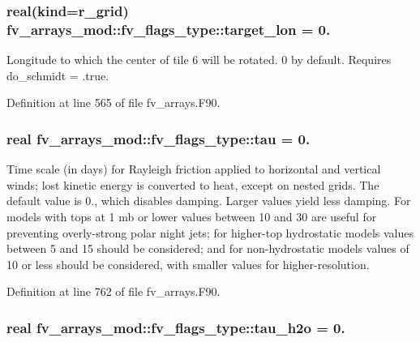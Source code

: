 \subsubsection[{target\-\_\-lon}]{\setlength{\rightskip}{0pt plus 5cm}real(kind={\bf r\-\_\-grid}) fv\-\_\-arrays\-\_\-mod\-::fv\-\_\-flags\-\_\-type\-::target\-\_\-lon = 0.}\label{structfv__arrays__mod_1_1fv__flags__type_a75dab9007778e7059a391cfd1a11a6e3}


Longitude to which the center of tile 6 will be rotated. 0 by default. Requires do\-\_\-schmidt = .true. 



Definition at line 565 of file fv\-\_\-arrays.\-F90.

\subsubsection[{tau}]{\setlength{\rightskip}{0pt plus 5cm}real fv\-\_\-arrays\-\_\-mod\-::fv\-\_\-flags\-\_\-type\-::tau = 0.}\label{structfv__arrays__mod_1_1fv__flags__type_ad0e102652d29d55c763458b70ea6e87d}


Time scale (in days) for Rayleigh friction applied to horizontal and vertical winds; lost kinetic energy is converted to heat, except on nested grids. The default value is 0., which disables damping. Larger values yield less damping. For models with tops at 1 mb or lower values between 10 and 30 are useful for preventing overly-\/strong polar night jets; for higher-\/top hydrostatic models values between 5 and 15 should be considered; and for non-\/hydrostatic models values of 10 or less should be considered, with smaller values for higher-\/resolution. 



Definition at line 762 of file fv\-\_\-arrays.\-F90.

\subsubsection[{tau\-\_\-h2o}]{\setlength{\rightskip}{0pt plus 5cm}real fv\-\_\-arrays\-\_\-mod\-::fv\-\_\-flags\-\_\-type\-::tau\-\_\-h2o = 0.}\label{structfv__arrays__mod_1_1fv__flags__type_af9fe4497904cedded7039fb1444c80f3}


